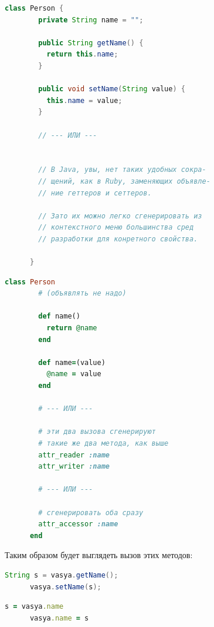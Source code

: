 \documentclass[a4paper, 14pt, titlepage]{extarticle}
\newenvironment{halfpage}%
    {\noindent\begin{minipage}[h]{0.49\linewidth}} %
    {\end{minipage}\hfill}
\begin{document}
  \begin{halfpage}
    \begin{lstlisting}[language=Java, title={Геттеры/сеттеры в Java}, gobble=6, texcl]
      class Person {
        private String name = "";
        
        public String getName() {
          return this.name;
        }

        public void setName(String value) {
          this.name = value;
        }

        // --- ИЛИ ---


        // В Java, увы, нет таких удобных сокра-
        // щений, как в Ruby, заменяющих объявле-
        // ние геттеров и сеттеров.

        // Зато их можно легко сгенерировать из
        // контекстного меню большинства сред
        // разработки для конретного свойства.

      }
    \end{lstlisting}
  \end{halfpage}
  \begin{halfpage}
    \begin{lstlisting}[language=Ruby, title={Аксессоры в Ruby}, gobble=6, texcl]
      class Person
        # (объявлять не надо)

        def name()
          return @name
        end
        
        def name=(value)
          @name = value
        end

        # --- ИЛИ ---

        # эти два вызова сгенерируют
        # такие же два метода, как выше
        attr_reader :name
        attr_writer :name

        # --- ИЛИ ---

        # сгенерировать оба сразу
        attr_accessor :name
      end
    \end{lstlisting}
  \end{halfpage}

  Таким образом будет выглядеть вызов этих методов:

  \begin{halfpage}
    \begin{lstlisting}[language=Java, title={Вызов геттера/сеттера в Java}, gobble=6, texcl]
      String s = vasya.getName();
      vasya.setName(s);
    \end{lstlisting}
  \end{halfpage}
  \begin{halfpage}
    \begin{lstlisting}[language=Ruby, title={Вызов аксессоров в Ruby}, gobble=6, texcl]
      s = vasya.name
      vasya.name = s
    \end{lstlisting}
  \end{halfpage}
\end{document}
